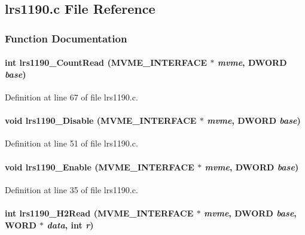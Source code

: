 \subsection{lrs1190.c File Reference}
\label{lrs1190_8c}


\subsubsection{Function Documentation}
\paragraph[{lrs1190\_\-CountRead}]{\setlength{\rightskip}{0pt plus 5cm}int lrs1190\_\-CountRead ({\bf MVME\_\-INTERFACE} $\ast$ {\em mvme}, \/  {\bf DWORD} {\em base})}\hfill\label{lrs1190_8c_a351573dde2decf49df9528a3290fdaac}


Definition at line 67 of file lrs1190.c.
\paragraph[{lrs1190\_\-Disable}]{\setlength{\rightskip}{0pt plus 5cm}void lrs1190\_\-Disable ({\bf MVME\_\-INTERFACE} $\ast$ {\em mvme}, \/  {\bf DWORD} {\em base})}\hfill\label{lrs1190_8c_ae645a9766fb8dc4a5ecc0022d7d1bb13}


Definition at line 51 of file lrs1190.c.
\paragraph[{lrs1190\_\-Enable}]{\setlength{\rightskip}{0pt plus 5cm}void lrs1190\_\-Enable ({\bf MVME\_\-INTERFACE} $\ast$ {\em mvme}, \/  {\bf DWORD} {\em base})}\hfill\label{lrs1190_8c_afbd4b1118296807316f03e0c661dc16d}


Definition at line 35 of file lrs1190.c.
\paragraph[{lrs1190\_\-H2Read}]{\setlength{\rightskip}{0pt plus 5cm}int lrs1190\_\-H2Read ({\bf MVME\_\-INTERFACE} $\ast$ {\em mvme}, \/  {\bf DWORD} {\em base}, \/  {\bf WORD} $\ast$ {\em data}, \/  int {\em r})}\hfill\label{lrs1190_8c_a3cd3588c5f95f5b1cefcbc497ffab043}


